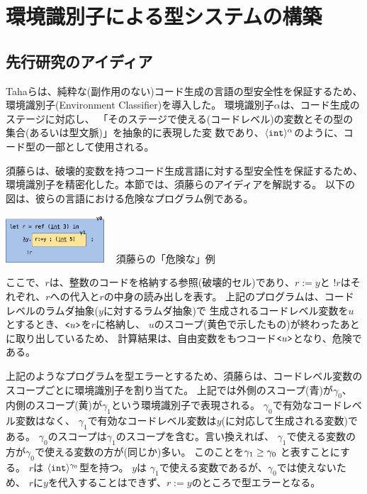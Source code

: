 
\section{環境識別子による型システムの構築}

\subsection{先行研究のアイディア}

Tahaら\cite{Taha:2003:EC:604131.604134}は、純粋な(副作用のない)コード生成の言語の型安全性を保証するため、
環境識別子(Environment Classifier)を導入した。
環境識別子$\alpha$は、コード生成のステージに対応し、
「そのステージで使える(コードレベル)の変数とその型の集合(あるいは型文脈)」を抽象的に表現した変
数であり、$\langle{\mbox{\texttt{int}}}\rangle^{\alpha}$のように、コード型の一部として使用される。

須藤ら\cite{Sudo2014}は、破壊的変数を持つコード生成言語に対する型安全性を保証するため、
環境識別子を精密化した。本節では、須藤らのアイディアを解説する。
以下の図は、彼らの言語における危険なプログラム例である。
\begin{center}
  \includegraphics[clip,width=4cm]{./img/sudo_ref.png} 
  須藤らの「危険な」例
\end{center}
ここで、$r$は、整数のコードを格納する参照(破壊的セル)であり、$r:=y$と
$!r$はそれぞれ、$r$への代入と$r$の中身の読み出しを表す。
上記のプログラムは、コードレベルのラムダ抽象($y$に対するラムダ抽象)で
生成されるコードレベル変数を$u$とするとき、$\texttt{<}{u}\texttt{>}$を$r$に格納し、
$u$のスコープ(黄色で示したもの)が終わったあとに取り出しているため、
計算結果は、自由変数をもつコード$\texttt{<}{u}\texttt{>}$となり、危険である。

上記のようなプログラムを型エラーとするため、須藤らは、コードレベル変数の
スコープごとに環境識別子を割り当てた。
上記では外側のスコープ(青)が$\gamma_0$、
内側のスコープ(黄)が$\gamma_1$という環境識別子で表現される。
$\gamma_0$で有効なコードレベル変数はなく、
$\gamma_1$で有効なコードレベル変数は$y$(に対応して生成される変数)である。
$\gamma_0$のスコープは$\gamma_1$のスコープを含む。言い換えれば、
$\gamma_1$で使える変数の方が$\gamma_0$で使える変数の方が(同じか)多い。
このことを$\gamma_1 \ge \gamma_0$ と表すことにする。
$r$は $\langle{\mbox{\texttt{int}}}\rangle^{\gamma_0}$型を持つ。
$y$は $\gamma_1$で使える変数であるが、$\gamma_0$では使えないため、
$r$に$y$を代入することはできず、$r:=y$のところで型エラーとなる。

